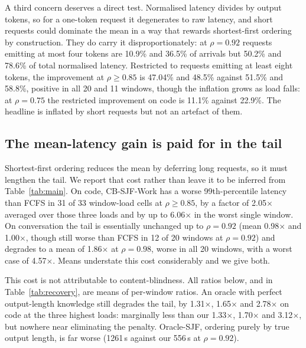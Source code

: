 \documentclass[conference,10pt,letterpaper]{IEEEtran}
\begin{document}
A third concern deserves a direct test. Normalised latency divides by output
tokens, so for a one-token request it degenerates to raw latency, and short
requests could dominate the mean in a way that rewards shortest-first ordering
by construction. They do carry it disproportionately: at $\rho=0.92$ requests
emitting at most four tokens are 10.9\% and 36.5\% of arrivals but 50.2\% and
78.6\% of total normalised latency. Restricted to requests emitting at least
eight tokens, the improvement at $\rho \ge 0.85$ is 47.04\% and 48.5\% against
51.5\% and 58.8\%, positive in all 20 and 11 windows, though the inflation grows as
load falls: at $\rho=0.75$ the restricted improvement on code is 11.1\% against
22.9\%. The headline is inflated by short requests but not an artefact of them.

\subsection{The mean-latency gain is paid for in the tail}
Shortest-first ordering reduces the mean by deferring long requests, so it must
lengthen the tail. We report that cost rather than leave it to be inferred from
Table~\ref{tab:main}. On code, CB-SJF-Work has a worse 99th-percentile latency
than FCFS in 31 of 33 window-load cells at $\rho \ge 0.85$, by a factor of
2.05$\times$ averaged over those three loads and by up to 6.06$\times$ in the
worst single window. On
conversation the tail is essentially unchanged up to $\rho=0.92$ (mean
0.98$\times$ and 1.00$\times$, though still worse than FCFS in 12 of 20 windows
at $\rho=0.92$) and degrades to a mean of 1.86$\times$ at $\rho=0.98$, worse in
all 20 windows, with a worst case of 4.57$\times$. Means understate this cost
considerably and we give both.

This cost is not attributable to content-blindness. All ratios below, and in
Table~\ref{tab:recovery}, are means of per-window ratios. An oracle with perfect
output-length knowledge still degrades the tail, by 1.31$\times$, 1.65$\times$
and 2.78$\times$ on code at the three highest loads: marginally less than our
1.33$\times$, 1.70$\times$ and 3.12$\times$, but nowhere near eliminating the
penalty. Oracle-SJF, ordering purely by true output length, is far worse
(1261\,s against our 556\,s at $\rho=0.92$).
\end{document}
